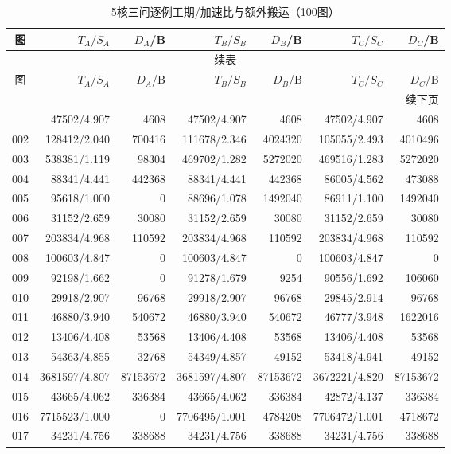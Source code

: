 \begin{longtable}{crrrrrr}
\caption{5核三问逐例工期/加速比与额外搬运（100图）}\label{tab:detail-5}\\
\toprule
图 & $T_A/S_A$ & $D_A$/B & $T_B/S_B$ & $D_B$/B & $T_C/S_C$ & $D_C$/B \\
\midrule
\endfirsthead
\multicolumn{7}{c}{续表}\\
\toprule
图 & $T_A/S_A$ & $D_A$/B & $T_B/S_B$ & $D_B$/B & $T_C/S_C$ & $D_C$/B \\
\midrule
\endhead
\midrule\multicolumn{7}{r}{续下页}\\
\endfoot
\bottomrule
\endlastfoot
001 & 47502/4.907 & 4608 & 47502/4.907 & 4608 & 47502/4.907 & 4608 \\
002 & 128412/2.040 & 700416 & 111678/2.346 & 4024320 & 105055/2.493 & 4010496 \\
003 & 538381/1.119 & 98304 & 469702/1.282 & 5272020 & 469516/1.283 & 5272020 \\
004 & 88341/4.441 & 442368 & 88341/4.441 & 442368 & 86005/4.562 & 473088 \\
005 & 95618/1.000 & 0 & 88696/1.078 & 1492040 & 86911/1.100 & 1492040 \\
006 & 31152/2.659 & 30080 & 31152/2.659 & 30080 & 31152/2.659 & 30080 \\
007 & 203834/4.968 & 110592 & 203834/4.968 & 110592 & 203834/4.968 & 110592 \\
008 & 100603/4.847 & 0 & 100603/4.847 & 0 & 100603/4.847 & 0 \\
009 & 92198/1.662 & 0 & 91278/1.679 & 9254 & 90556/1.692 & 106060 \\
010 & 29918/2.907 & 96768 & 29918/2.907 & 96768 & 29845/2.914 & 96768 \\
011 & 46880/3.940 & 540672 & 46880/3.940 & 540672 & 46777/3.948 & 1622016 \\
012 & 13406/4.408 & 53568 & 13406/4.408 & 53568 & 13406/4.408 & 53568 \\
013 & 54363/4.855 & 32768 & 54349/4.857 & 49152 & 53418/4.941 & 49152 \\
014 & 3681597/4.807 & 87153672 & 3681597/4.807 & 87153672 & 3672221/4.820 & 87153672 \\
015 & 43665/4.062 & 336384 & 43665/4.062 & 336384 & 42872/4.137 & 336384 \\
016 & 7715523/1.000 & 0 & 7706495/1.001 & 4784208 & 7706472/1.001 & 4718672 \\
017 & 34231/4.756 & 338688 & 34231/4.756 & 338688 & 34231/4.756 & 338688 \\

\end{longtable}
